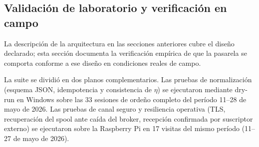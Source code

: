 
\subsection{Validación de laboratorio y verificación en campo}
\label{subsec:validacion_gateway_campo}

La descripción de la arquitectura en las secciones anteriores cubre el diseño
declarado; esta sección documenta la verificación empírica de que la pasarela
se comporta conforme a ese diseño en condiciones reales de campo.

La suite se dividió en dos planos complementarios. Las pruebas de
normalización (esquema \acs{JSON}, idempotencia y consistencia de
$\eta$) se ejecutaron mediante dry-run en Windows sobre las 33
sesiones de ordeño completo del período 11--28 de mayo de 2026.
Las pruebas de canal seguro y resiliencia operativa (\acs{TLS},
recuperación del spool ante caída del broker, recepción confirmada
por suscriptor externo) se ejecutaron sobre la Raspberry Pi en 17
visitas del mismo período (11--27 de mayo de 2026).

